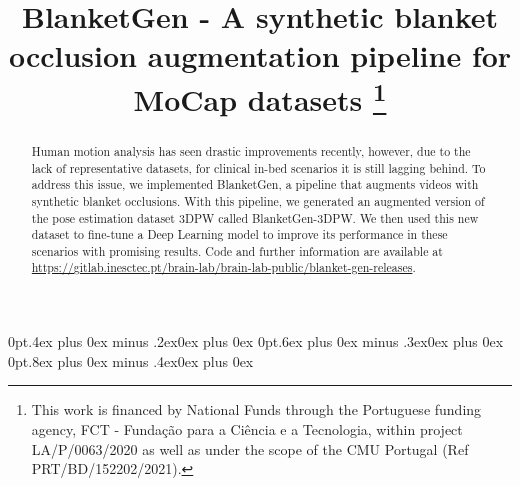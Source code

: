 \documentclass[conference]{IEEEtran}
\begin{document}
\title{BlanketGen - A synthetic blanket occlusion augmentation pipeline for MoCap datasets
\thanks{This work is financed by National Funds through the Portuguese funding agency, FCT - Fundação para a Ciência e a Tecnologia, within project LA/P/0063/2020 as well as under the scope of the CMU Portugal (Ref PRT/BD/152202/2021).}
}



\setlength{\parskip}{0pt}
\titlespacing*{\subsubsection}
{0pt}{.4ex plus 0ex minus .2ex}{0ex plus 0ex}
\titlespacing*{\subsection}
{0pt}{.6ex plus 0ex minus .3ex}{0ex plus 0ex}
\titlespacing*{\section}
{0pt}{.8ex plus 0ex minus .4ex}{0ex plus 0ex}

\author{
}

\maketitle

\begin{abstract}
Human motion analysis has seen drastic improvements recently, however, due to the lack of representative datasets, for clinical in-bed scenarios it is still lagging behind. To address this issue, we implemented BlanketGen, a pipeline that augments videos with synthetic blanket occlusions. With this pipeline, we generated an augmented version of the pose estimation dataset 3DPW called BlanketGen-3DPW. We then used this new dataset to fine-tune a Deep Learning model to improve its performance in these scenarios with promising results. Code and further information are available at \href{https://gitlab.inesctec.pt/brain-lab/brain-lab-public/blanket-gen-releases}{https://gitlab.inesctec.pt/brain-lab/brain-lab-public/blanket-gen-releases}.
\end{abstract}
\end{document}

